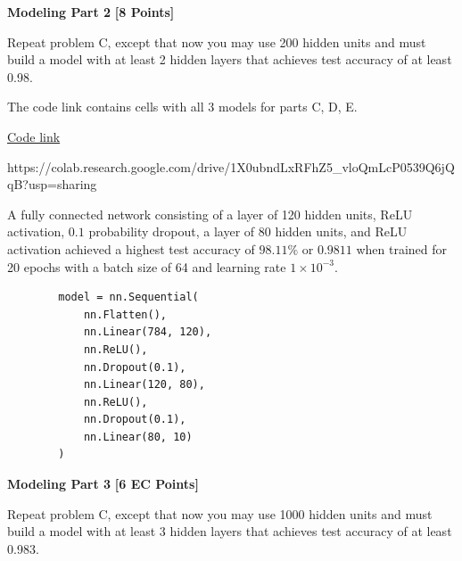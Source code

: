 \problem \textbf{Modeling Part 2} \textbf{[8 Points]}

Repeat problem C, except that now you may use 200 hidden units and must build a model with at least 2 hidden layers that achieves test accuracy of at least 0.98.

\begin{solution}
    The code link contains cells with all 3 models for parts C, D, E.

    \href{https://colab.research.google.com/drive/1X0ubndLxRFhZ5_vloQmLcP0539Q6jQqB?usp=sharing}{Code link}

    https://colab.research.google.com/drive/1X0ubndLxRFhZ5_vloQmLcP0539Q6jQqB?usp=sharing

    A fully connected network consisting of a layer of 120 hidden units, ReLU activation, $0.1$ probability dropout, a layer of 80 hidden units, and ReLU activation achieved a highest test accuracy of $98.11\%$ or $\boxed{0.9811}$ when trained for 20 epochs with a batch size of 64 and learning rate $1 \times 10^{-3}$.

    \begin{verbatim}
        model = nn.Sequential(
            nn.Flatten(),
            nn.Linear(784, 120),
            nn.ReLU(),
            nn.Dropout(0.1),
            nn.Linear(120, 80),
            nn.ReLU(),
            nn.Dropout(0.1),
            nn.Linear(80, 10)
        )
    \end{verbatim}
\end{solution}

\newpage

\problem \textbf{Modeling Part 3} \textbf{[6 EC Points]}

Repeat problem C, except that now you may use 1000 hidden units and must build a model with at least 3 hidden layers that achieves test accuracy of at least 0.983.

